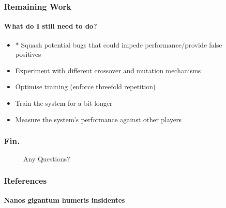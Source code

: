 \documentclass[aspectratio=169]{beamer}
\begin{document}
\begin{frame}
	\frametitle{Remaining Work}
	\framesubtitle{What do I still need to do?}
	\begin{itemize}
		\item * Squash potential bugs that could impede performance/provide false positives
		\item Experiment with different crossover and mutation mechanisms
		\item Optimise training (enforce threefold repetition)
		\item Train the system for a bit longer
		\item Measure the system's performance against other players
	\end{itemize}
\end{frame}

\begin{frame}
	\frametitle{Fin.}
	
	\begin{figure}
		\LARGE
	Any Questions?
	\end{figure}
\end{frame}

\begin{frame}
	\frametitle{References}
	\framesubtitle{Nanos gigantum humeris insidentes}


	
	{
		\tiny
		
		
	}


\end{frame}
\end{document}
